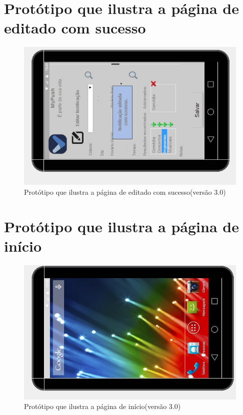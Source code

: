\begin{apendicesenv}
    \pagebreak
      \section*{Protótipo que ilustra a página de editado com sucesso}

    \begin{figure}[!htbp]
      \centering
      \includegraphics[scale=0.9, angle=-90]{editaveis/figuras/prototipo_alta_fidelidade_v3/3_15}
      \caption{Protótipo que ilustra a página de editado com sucesso(versão 3.0)}
      \label{v3}
    \end{figure}
    
    \pagebreak
      \section*{Protótipo que ilustra a página de início}

    \begin{figure}[!htbp]
      \centering
      \includegraphics[scale=0.9, angle=-90]{editaveis/figuras/prototipo_alta_fidelidade_v3/3_16}
      \caption{Protótipo que ilustra a página de início(versão 3.0)}
      \label{v3}
    \end{figure}

\end{apendicesenv}
